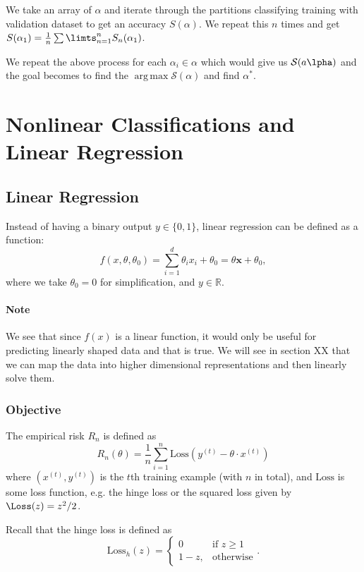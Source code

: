 \documentclass{article}
\DeclareMathOperator*{\argmax}{arg\,max}
\begin{document}
We take an array of $\alpha$ and iterate through the partitions classifying training with validation dataset to get an accuracy $S(\alpha)$. We repeat this $n$ times and get $S(\alpha_1)=\frac{1}{n}\sum\limts_{n=1}^n S_n(\alpha_1)$.

We repeat the above process for each $\alpha_i\in\alpha$ which would give us $\mathcal{S}(a\lpha)$ and the goal becomes to find the $\argmax{\mathcal{S}(\alpha)}$ and find $\alpha^*$.

\section{Nonlinear Classifications and Linear Regression}
\subsection{Linear Regression}
Instead of having a binary output $y\in\{0,1\}$, linear regression can be defined as a function:
\[f(x,\theta,\theta_0)=\sum\limits_{i=1}^d\theta_i x_i+\theta_0=\theta\mathbf{x}+\theta_0,\]
where we take $\theta_0=0$ for simplification, and $y\in\mathbb{R}$.

\paragraph{Note} We see that since $f(x)$ is a linear function, it would only be useful for predicting linearly shaped data and that is true. We will see in section XX that we can map the data into higher dimensional representations and then linearly solve them.

\subsubsection{Objective}
The empirical risk $R_n$ is defined as 
\[R_n(\theta)=\frac{1}{n}\sum\limits_{i=1}^n\text{Loss}\left(y^{(t)}-\theta\cdot x^{(t)}\right)\]
where $\left(x^{(t)},y^{(t)}\right)$ is the $t$th training example (with $n$ in total), and $\text{Loss}$ is some loss function, e.g. the hinge loss or the squared loss given by $\Loss(z)=z^2/2$.


Recall that the hinge loss is defined as 
\[\text{Loss}_h(z)=\begin{cases}0&\text{if }z\geq 1\\
1-z,&\text{otherwise}\end{cases}.\]
\end{document}

